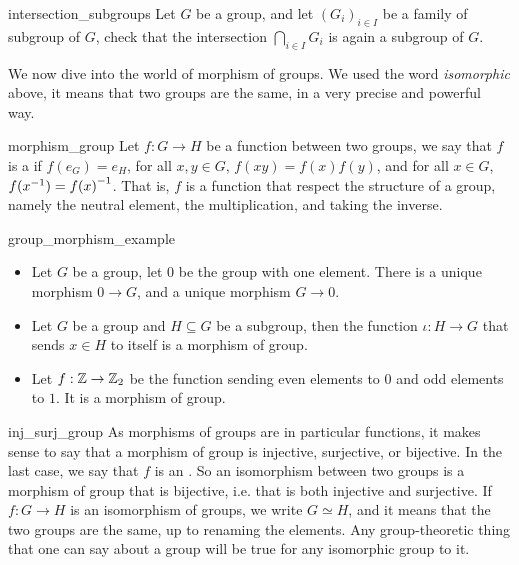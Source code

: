 \begin{cex}{}{intersection_subgroups}
    Let \( G \) be a group, and let \( (G_i)_{i \in I} \) be a family of subgroup of \( G \), check that the intersection \( \bigcap_{i\in I} G_i \) is again a subgroup of \( G \).
\end{cex}

We now dive into the world of morphism of groups. We used the word \textit{isomorphic} above, it means that two groups are the same, in a very precise and powerful way.

\begin{cdef}{}{morphism_group}
    Let \( f : G \to H \) be a function between two groups, we say that \( f \) is a  if \( f(e_G) = e_H \), for all \( x, y \in G \), \( f(xy) = f(x)f(y) \), and for all \( x \in G \), \( f({x}^{-1}) = {f(x)}^{-1} \). That is, \( f \) is a function that respect the structure of a group, namely the neutral element, the multiplication, and taking the inverse. 
\end{cdef}

\begin{cexp}{}{group_morphism_example}
    \begin{itemize}
        \item Let \( G \) be a group, let \( 0 \) be the group with one element. There is a unique morphism \( 0 \to G \), and a unique morphism \( G \to 0 \).
        \item Let \( G \) be a group and \( H \subseteq G \) be a subgroup, then the function \( \iota : H \to G \) that sends \( x \in H \) to itself is a morphism of group.
        \item Let \( f : \mathbb{Z} \to \mathbb{Z}_2 \) be the function sending even elements to \( 0 \) and odd elements to \( 1 \). It is a morphism of group. 
    \end{itemize}
\end{cexp}

\begin{crem}{}{inj_surj_group}
    As morphisms of groups are in particular functions, it makes sense to say that a morphism of group is injective, surjective, or bijective. In the last case, we say that \( f \) is an . So an isomorphism between two groups is a morphism of group that is bijective, i.e. that is both injective and surjective. If \( f : G \to H \) is an isomorphism of groups, we write \( G \simeq H \), and it means that the two groups are the same, up to renaming the elements. Any group-theoretic thing that one can say about a group will be true for any isomorphic group to it.
\end{crem}


